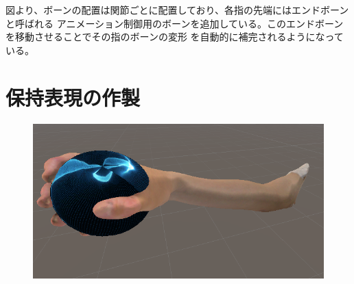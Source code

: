 \documentclass{ltjsreport}
\begin{document}
		図より、ボーンの配置は関節ごとに配置しており、各指の先端にはエンドボーンと呼ばれる
		アニメーション制御用のボーンを追加している。このエンドボーンを移動させることでその指のボーンの変形
		を自動的に補完されるようになっている。

	\section{保持表現の作製}

		\begin{figure}[H]
		\centering
		\begin{minipage}{0.4\columnwidth}
		\centering
		\includegraphics[width = \columnwidth]{../figs/grapsphere_side.png}
		\end{minipage}
		\hspace{0.04\columnwidth}
		\begin{minipage}{0.4\columnwidth}
		\centering

\end{minipage}
\end{figure}
\end{document}

